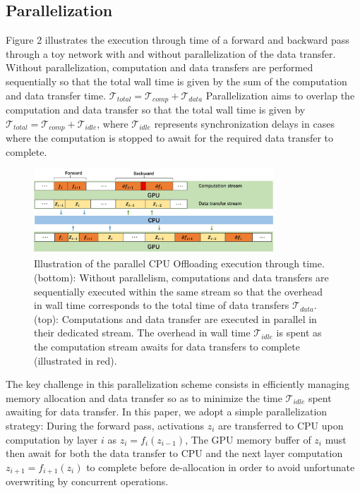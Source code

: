 \documentclass[11pt,onecolumn]{article}
\begin{document}
\subsection{Parallelization}

Figure 2 illustrates the execution through time of a forward 
and backward pass through a toy network with and without parallelization of the data transfer.
Without parallelization, computation and data transfers are performed sequentially 
so that the total wall time is given by the sum of the computation and data transfer time.
$\mathcal{T}_{total} = \mathcal{T}_{comp} + \mathcal{T}_{data}$
Parallelization aims to overlap the computation and data transfer so that the total wall time is given by
$\mathcal{T}_{total} = \mathcal{T}_{comp} + \mathcal{T}_{idle}$, where $\mathcal{T}_{idle}$ represents synchronization delays in cases where the computation is stopped to await for the required data transfer to complete.

\begin{figure}[h!]
\centering
\includegraphics[width=0.8\textwidth]{Figure2.jpg}
\caption{Illustration of the parallel CPU Offloading execution through time.
(bottom): Without parallelism, computations and data transfers are sequentially executed within the same stream
so that the overhead in wall time corresponds to the total time of data transfers $\mathcal{T}_{data}$.
(top): Computations and data transfer are executed in parallel in their dedicated stream. 
The overhead in wall time $\mathcal{T}_{idle}$ is spent as the computation stream awaits 
for data transfers to complete (illustrated in red). 
}
\end{figure}


The key challenge in this parallelization scheme consists in efficiently
managing memory allocation and data transfer so as to
minimize the time $\mathcal{T}_{idle}$ spent awaiting for data transfer.
In this paper, we adopt a simple parallelization strategy:
During the forward pass, activations $z_i$ are transferred to CPU 
upon computation by layer $i$ as $z_i = f_i(z_{i-1})$,
The GPU memory buffer of $z_i$ must then await for both the data transfer to CPU and
the next layer computation $z_{i+1} = f_{i+1}(z_{i})$ to complete before de-allocation in order to
avoid unfortunate overwriting by concurrent operations.
\end{document}
